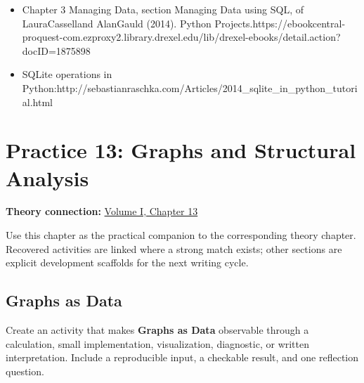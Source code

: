 \documentclass[
  letterpaper,
]{scrbook}
\providecommand{\tightlist}{%
  \setlength{\itemsep}{0pt}\setlength{\parskip}{0pt}}
\begin{document}

\begin{itemize}
\tightlist
\item
  Chapter 3 Managing Data, section Managing Data using SQL, of
  LauraCasselland AlanGauld (2014). Python
  Projects.https://ebookcentral-proquest-com.ezproxy2.library.drexel.edu/lib/drexel-ebooks/detail.action?docID=1875898
\item
  SQLite operations in
  Python:http://sebastianraschka.com/Articles/2014\_sqlite\_in\_python\_tutorial.html
\end{itemize}

\chapter*{Practice 13: Graphs and Structural
Analysis}\label{ch-practice-13}


\textbf{Theory connection:} \hyperref[ch-graphs]{Volume I, Chapter 13}

Use this chapter as the practical companion to the corresponding theory
chapter. Recovered activities are linked where a strong match exists;
other sections are explicit development scaffolds for the next writing
cycle.

\section*{Graphs as Data}\label{sec-pr-13-graphs-as-data}


\begin{tcolorbox}[enhanced jigsaw, arc=.35mm, bottomrule=.15mm, bottomtitle=1mm, breakable, colback=white, colbacktitle=quarto-callout-note-color!10!white, colframe=quarto-callout-note-color-frame, coltitle=black, left=2mm, leftrule=.75mm, opacityback=0, opacitybacktitle=0.6, rightrule=.15mm, title=\textcolor{quarto-callout-note-color}{\faInfo}\hspace{0.5em}{Practice development scaffold}, titlerule=0mm, toprule=.15mm, toptitle=1mm]

Create an activity that makes \textbf{Graphs as Data} observable through
a calculation, small implementation, visualization, diagnostic, or
written interpretation. Include a reproducible input, a checkable
result, and one reflection question.

\end{tcolorbox}
\end{document}
